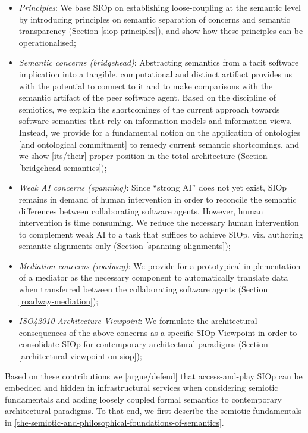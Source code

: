 \documentclass[a4paper,11pt,oneside,oldfontcommands]{memoir}
\newcounter{para}
\theoremstyle{definition}
\theoremstyle{break}		%
\numberwithin{equation}{chapter}
\numberwithin{figure}{chapter}
\begin{document}
\begin{itemize}
\tightlist
\item
  \emph{Principles}: We base SIOp on establishing loose-coupling at the
  semantic level by introducing principles on semantic separation of
  concerns and semantic transparency (Section \ref{siop-principles}),
  and show how these principles can be operationalised;
\item
  \emph{Semantic concerns (bridgehead)}: Abstracting semantics from a
  tacit software implication into a tangible, computational and distinct
  artifact provides us with the potential to connect to it and to make
  comparisons with the semantic artifact of the peer software agent.
  Based on the discipline of semiotics, we explain the shortcomings of
  the current approach towards software semantics that rely on
  information models and information views. Instead, we provide for a
  fundamental notion on the application of ontologies {[}and ontological
  commitment{]} to remedy current semantic shortcomings, and we show
  {[}its/their{]} proper position in the total architecture (Section
  \ref{bridgehead-semantics});
\item
  \emph{Weak AI concerns (spanning)}: Since ``strong AI'' does not yet
  exist, SIOp remains in demand of human intervention in order to
  reconcile the semantic differences between collaborating software
  agents. However, human intervention is time consuming. We reduce the
  necessary human intervention to complement weak AI to a task that
  suffices to achieve SIOp, viz. authoring semantic alignments only
  (Section \ref{spanning-alignments});
\item
  \emph{Mediation concerns (roadway)}: We provide for a prototypical
  implementation of a mediator as the necessary component to
  automatically translate data when transferred between the
  collaborating software agents (Section \ref{roadway-mediation});
\item
  \emph{ISO42010 Architecture Viewpoint}: We formulate the architectural
  consequences of the above concerns as a specific SIOp Viewpoint in
  order to consolidate SIOp for contemporary architectural paradigms
  (Section \ref{architectural-viewpoint-on-siop});
\end{itemize}

Based on these contributions we {[}argue/defend{]} that access-and-play
SIOp can be embedded and hidden in infrastructural services when
considering semiotic fundamentals and adding loosely coupled formal
semantics to contemporary architectural paradigms. To that end, we first
describe the semiotic fundamentals in
\cref{the-semiotic-and-philosophical-foundations-of-semantics}.
\end{document}
